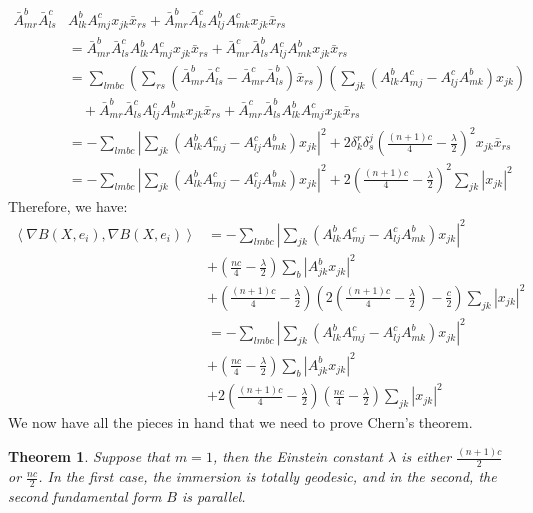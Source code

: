 \documentclass[11pt]{amsart}
\newtheorem{thm}[subsection]{Theorem}
\def \la { \left\langle }
\def \ra { \right\rangle }
\theoremstyle{definition}
\begin{document}
\begin{align*}
\bar{A}^b_{mr} \bar{A}^c_{ls} & A^b_{lk} A^c_{mj} x_{jk} \bar{x}_{rs} + \bar{A}^b_{mr} \bar{A}^c_{ls} A^b_{lj} A^c_{mk} x_{jk} \bar{x}_{rs} \\ 
&= \bar{A}^b_{mr} \bar{A}^c_{ls} A^b_{lk} A^c_{mj} x_{jk} \bar{x}_{rs} + \bar{A}^c_{mr} \bar{A}^b_{ls} A^c_{lj} A^b_{mk} x_{jk} \bar{x}_{rs} \\
&=  \sum_{lmbc} \left( \sum_{rs} ( \bar{A}^b_{mr} \bar{A}^c_{ls} - \bar{A}^c_{mr} \bar{A}^b_{ls} ) \bar{x}_{rs} \right) \left( \sum_{jk} ( A^b_{lk} A^c_{mj} -  A^c_{lj} A^b_{mk} ) x_{jk} \right)\\
&\quad +  \bar{A}^b_{mr} \bar{A}^c_{ls} A^c_{lj} A^b_{mk} x_{jk} \bar{x}_{rs} + \bar{A}^c_{mr} \bar{A}^b_{ls} A^b_{lk} A^c_{mj} x_{jk} \bar{x}_{rs} \\
&= - \sum_{lmbc} \left| \sum_{jk} \left( A^b_{lk} A^c_{mj} -  A^c_{lj} A^b_{mk}  \right) x_{jk} \right|^2 + 2 \delta^r_k \delta^j_s \left( \frac{(n+1)c}{4} - \frac{\lambda}{2} \right)^2 x_{jk} \bar{x}_{rs} \\
&= - \sum_{lmbc} \left| \sum_{jk} \left( A^b_{lk} A^c_{mj} -  A^c_{lj} A^b_{mk} \right) x_{jk} \right|^2 + 2 \left( \frac{(n+1)c}{4} - \frac{\lambda}{2} \right)^2 \sum_{jk} \left| x_{jk} \right|^2
\end{align*}
%
Therefore, we have:
%
\begin{align*}
\la \nabla B (X, e_i), \nabla B(X, e_i) \ra &= - \sum_{lmbc} \left| \sum_{jk} \left( A^b_{lk} A^c_{mj} -  A^c_{lj} A^b_{mk} \right) x_{jk} \right|^2 \\
&+ \left( \frac{nc}{4} - \frac{\lambda}{2} \right) \sum_{b} \left| A^b_{jk} x_{jk} \right|^2 \\
&+ \left( \frac{(n+1)c}{4} - \frac{\lambda}{2} \right) \left( 2 \left( \frac{(n+1)c}{4} - \frac{\lambda}{2} \right) - \frac{c}{2} \right) \sum_{jk} \left| x_{jk} \right|^2 \\
&=  - \sum_{lmbc} \left| \sum_{jk} \left( A^b_{lk} A^c_{mj} -  A^c_{lj} A^b_{mk} \right) x_{jk} \right|^2 \\
&+ \left( \frac{nc}{4} - \frac{\lambda}{2} \right) \sum_{b} \left| A^b_{jk} x_{jk} \right|^2 \\
&+ 2 \left( \frac{(n+1)c}{4} - \frac{\lambda}{2} \right) \left( \frac{nc}{4} - \frac{\lambda}{2} \right) \sum_{jk} \left| x_{jk} \right|^2
\end{align*}
%
We now have all the pieces in hand that we need to prove Chern's theorem.

\begin{thm} 
Suppose that $m=1$, then the Einstein constant $\lambda$ is either $\frac{(n+1)c}{2}$ or $\frac{nc}{2}$.  In the first case, the immersion is totally geodesic, and in the second, the second fundamental form $B$ is parallel. 
\end{thm}
\end{document}
